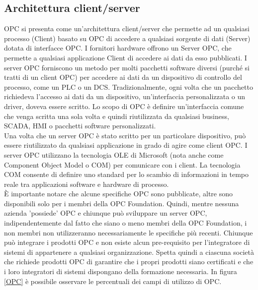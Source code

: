 \documentclass[12pt, a4paper, oneside]{book}
\begin{document}
\subsection{Architettura client/server}
OPC si presenta come un'architettura client/server che permette ad un qualsiasi processo (Client) basato su OPC di accedere a qualsiasi sorgente di dati (Server) dotata di interfacce OPC. I fornitori hardware offrono un Server OPC, che permette a qualsiasi applicazione Client di accedere ai dati da esso pubblicati. I server OPC forniscono un metodo per molti pacchetti software diversi (purché si tratti di un client OPC) per accedere ai dati da un dispositivo di controllo del processo, come un PLC o un DCS. Tradizionalmente, ogni volta che un pacchetto richiedeva l'accesso ai dati da un dispositivo, un'interfaccia personalizzata o un driver, doveva essere scritto. Lo scopo di OPC è definire un'interfaccia comune che venga scritta una sola volta e quindi riutilizzata da qualsiasi business, SCADA, HMI o pacchetti software personalizzati.
\\Una volta che un server OPC è stato scritto per un particolare dispositivo, può essere riutilizzato da qualsiasi applicazione in grado di agire come client OPC. I server OPC utilizzano la tecnologia OLE di Microsoft (nota anche come Component Object Model o COM) per comunicare con i client. La tecnologia COM consente di definire uno standard per lo scambio di informazioni in tempo reale tra applicazioni software e hardware di processo.
\\È importante notare che alcune specifiche OPC sono pubblicate, altre sono disponibili solo per i membri della OPC Foundation. Quindi, mentre nessuna azienda 'possiede' OPC e chiunque può sviluppare un server OPC, indipendentemente dal fatto che siano o meno membri della OPC Foundation, i non membri non utilizzeranno necessariamente le specifiche più recenti. Chiunque può integrare i prodotti OPC e non esiste alcun pre-requisito per l'integratore di sistemi di appartenere a qualsiasi organizzazione. Spetta quindi a ciascuna società che richiede prodotti OPC di garantire che i propri prodotti siano certificati e che i loro integratori di sistemi dispongano della formazione necessaria.
In figura \ref{OPC} è possibile osservare le percentuali dei campi di utilizzo di OPC.
\end{document}
